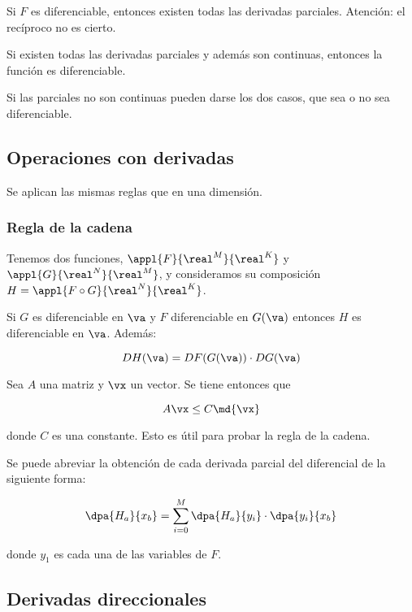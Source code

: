 \documentclass[12pt,a4paper,titlepage]{apuntes}
\begin{document}
\begin{theorem}
Si $F$ es diferenciable, entonces existen todas las derivadas parciales. Atención: el recíproco no es cierto.
\end{theorem}

\begin{theorem}
Si existen todas las derivadas parciales y además son continuas, entonces la función es diferenciable.
\end{theorem}

\begin{remark}
Si las parciales no son continuas pueden darse los dos casos, que sea o no sea diferenciable.
\end{remark}

\subsection{Operaciones con derivadas}

Se aplican las mismas reglas que en una dimensión.

\subsubsection{Regla de la cadena}

Tenemos dos funciones, $\appl{F}{\real^M}{\real^K}$ y $\appl{G}{\real^N}{\real^M}$, y consideramos su composición $H=\appl{F\circ G}{\real^N}{\real^K}$.

\begin{theorem}
Si $G$ es diferenciable en $\va$ y $F$ diferenciable en $G(\va)$ entonces $H$ es diferenciable en $\va$. Además:

\[DH (\va) = DF(G(\va))\cdot DG(\va) \]
\end{theorem}

\begin{theorem}
Sea $A$ una matriz y $\vx$ un vector. Se tiene entonces que 

\[ A\vx \leq C\md{\vx} \]

donde $C$ es una constante. Esto es útil para probar la regla de la cadena.
\end{theorem}

Se puede abreviar la obtención de cada derivada parcial del diferencial de la siguiente forma:

\[ \dpa{H_a}{x_b} = \sum_{i=0}^M\dpa{H_a}{y_i}\cdot \dpa{y_i}{x_b} \]


donde $y_1$ es cada una de las variables de $F$.

\subsection{Derivadas direccionales}
\end{document}
